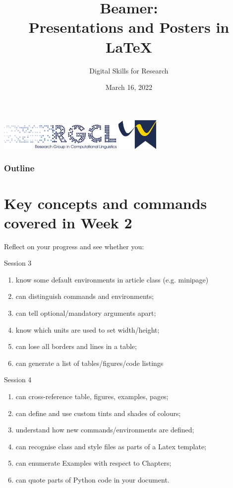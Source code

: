 \documentclass[11pt]{beamer} %
\author{Digital Skills for Research}
\title{Beamer: \\Presentations and Posters in \LaTeX}
\institute{RGCL\\University of Wolverhampton}
\date{March 16, 2022}
\begin{document}
	
	\begin{frame}[plain]
		\includegraphics[width=60mm]{pics/RGCL}%
		\hfill
		\includegraphics[width=20mm]{pics/wlv-flag}%
		\maketitle %
	\end{frame}

	\begin{frame}[plain]
		\frametitle{Outline}
		\tableofcontents
	\end{frame}


\section[Week 2 Revision]{Key concepts and commands covered in Week 2}

\begin{frame}[plain,shrink=1]{Reflect on your progress and see whether you:}


\begin{block}{Session 3}
	\begin{enumerate}
		\item know some default environments in article class (e.g. minipage)
		\item can distinguish commands and environments;
		\item can tell optional/mandatory arguments apart;
		\item know which units are used to set width/height;
		\item can lose all borders and lines in a table;
		\item can generate a list of tables/figures/code listings
	\end{enumerate}
\end{block}
%
\begin{block}{Session 4}
	\begin{enumerate}
		\item can cross-reference table, figures, examples, pages;
		\item can define and use custom tints and shades of colours;
		\item understand how new commands/environments are defined;
		\item can recognise class and style files as parts of a Latex template;
		\item can enumerate Examples with respect to Chapters;
		\item can quote parts of Python code in your document.
	\end{enumerate}
\end{block}
\end{frame}
\end{document}
